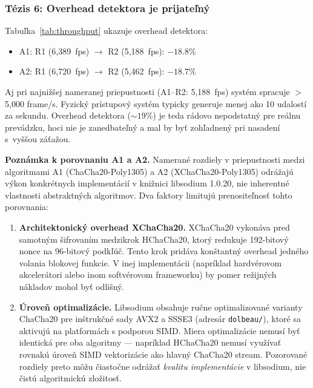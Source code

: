 \subsubsection{Tézis 6: Overhead detektora je prijateľný}

Tabuľka~\ref{tab:throughput} ukazuje overhead detektora:
\begin{itemize}[leftmargin=*,itemsep=1pt]
  \item A1: R1 (6{,}389~fps) $\rightarrow$ R2 (5{,}188~fps): $-18.8\%$
  \item A2: R1 (6{,}720~fps) $\rightarrow$ R2 (5{,}462~fps): $-18.7\%$
\end{itemize}

\noindent Aj pri najnižšej nameranej priepustnosti (A1--R2: 5{,}188~fps) systém spracuje $>$5{,}000 frame/s. Fyzický prístupový systém typicky generuje menej ako 10 udalostí za sekundu. Overhead detektora (${\sim}19\%$) je teda rádovo nepodstatný pre reálnu prevádzku, hoci nie je zanedbateľný a mal by byť zohľadnený pri nasadení s~vyššou záťažou.

\medskip
\noindent\textbf{Poznámka k porovnaniu A1 a A2.}
Namerané rozdiely v priepustnosti medzi algoritmami A1 (ChaCha20-Poly1305) a A2 (XChaCha20-Poly1305) odrážajú výkon konkrétnych implementácií v knižnici libsodium 1.0.20\cite{LibsodiumDoc}, nie inherentné vlastnosti abstraktných algoritmov. Dva faktory limitujú prenositeľnosť tohto porovnania:

\begin{enumerate}[leftmargin=*,itemsep=2pt]
  \item \textbf{Architektonický overhead XChaCha20.} XChaCha20 vykonáva pred samotným šifrovaním medzikrok HChaCha20\cite{Bernstein2012}, ktorý redukuje 192-bitový nonce na 96-bitový podkľúč. Tento krok pridáva konštantný overhead jedného volania blokovej funkcie. V inej implementácii (napríklad hardvérovom akcelerátori alebo inom softvérovom frameworku) by pomer režijných nákladov mohol byť odlišný.
  \item \textbf{Úroveň optimalizácie.} Libsodium obsahuje ručne optimalizované varianty ChaCha20 pre inštrukčné sady AVX2 a SSSE3 (adresár \texttt{dolbeau/}), ktoré sa aktivujú na platformách s podporou SIMD. Miera optimalizácie nemusí byť identická pre oba algoritmy --- napríklad HChaCha20 nemusí využívať rovnakú úroveň SIMD vektorizácie ako hlavný ChaCha20 stream. Pozorované rozdiely preto môžu čiastočne odrážať \emph{kvalitu implementácie} v libsodium, nie čistú algoritmickú zložitosť.
\end{enumerate}

